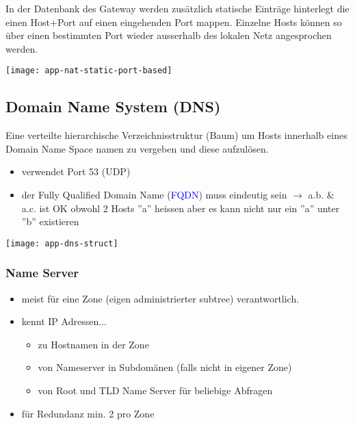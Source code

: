 In der Datenbank des Gateway werden zusätzlich statische Einträge hinterlegt
die einen Host+Port auf einen eingehenden Port mappen. Einzelne Hosts können so
über einen bestimmten Port wieder ausserhalb des lokalen Netz angesprochen werden.

\texttt{[image: app-nat-static-port-based]}









\subsection{Domain Name System (DNS)}

Eine verteilte hierarchische Verzeichnisstruktur (Baum) um
Hosts innerhalb eines Domain Name Space namen zu vergeben und diese aufzulösen.

\begin{itemize}
	\item verwendet Port 53 (UDP)
	\item der Fully Qualified Domain Name (\textcolor{blue}{FQDN}) muss eindeutig
	      sein $\rightarrow$ a.b. \& a.c. ist OK obwohl 2 Hosts ''a'' heissen aber es kann nicht
	      nur ein ''a'' unter ''b'' existieren
\end{itemize}

\texttt{[image: app-dns-struct]}

\subsubsection{Name Server}

\begin{itemize}
	\item meist für eine Zone (eigen administrierter subtree) verantwortlich.
	\item kennt IP Adressen...
	      \begin{itemize}
		      \item zu Hostnamen in der Zone
		      \item von Nameserver in Subdomänen (falls nicht in eigener Zone)
		      \item von Root und TLD Name Server für beliebige Abfragen
	      \end{itemize}
	\item für Redundanz min. 2 pro Zone
\end{itemize}


